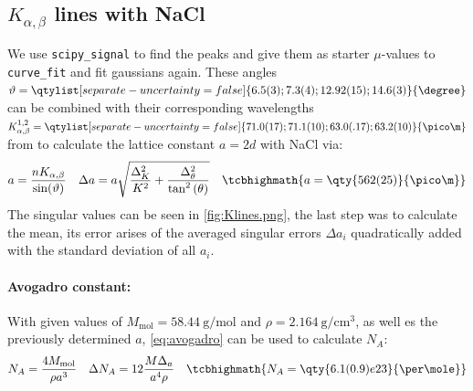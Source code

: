 \subsection[\texorpdfstring{\(K_{\alpha,\beta}\) lines with NaCl}{K-alpha, K-beta lines with NaCl}]{\boldmath\(K_{\alpha,\beta}\) lines with NaCl}
We use \verb|scipy_signal| to find the peaks and give them as starter \(\mu\)-values to \verb|curve_fit| and fit gaussians again. 
These angles \(\vartheta=\qtylist[separate-uncertainty=false]{6.5(3);7.3(4);12.92(15);14.6(3)}{\degree}\) can be combined with their corresponding wavelengths \(K^{1,2}_{\alpha,\beta}=\qtylist[separate-uncertainty=false]{71.0(17);71.1(10);63.0(.17);63.2(10)}{\pico\m}\) from  to calculate the lattice constant \(a=2d\) with NaCl via:
\begin{align}
    a=\frac{nK_{\alpha,\beta}}{\sin(\vartheta)}&&\Delta a=a\sqrt{\frac{\Delta_{K}^{2}}{K^{2}} + \frac{\Delta_{\theta}^{2}}{\tan^{2}{\left(\theta \right)}}}&&\tcbhighmath{a=\qty{562(25)}{\pico\m}}
\end{align}
The singular values can be seen in \cref{fig:Klines.png}, the last step was to calculate the mean, its error arises of the averaged singular errors \(\Delta a_i\) quadratically added with the standard deviation of all \(a_i\). 
\newpage
{}
\FloatBarrier

\paragraph{Avogadro constant:} With given\autocite{Skript_2.2} values of \(M_\text{mol}=\qty{58.44}{\gram\per\mol}\) and \(\rho=\qty{2.164}{\g\per\cm\cubed}\), as well es the previously determined \(a\), \cref{eq:avogadro} can be used to calculate \(N_A\):
\begin{align}
    N_A=\frac{4M_\text{mol}}{\rho a^3}&&\Delta N_A=12\frac{M\Delta_a}{a^4\rho}&&\tcbhighmath{N_A=\qty{6.1(0.9)e23}{\per\mole}}
\end{align}


